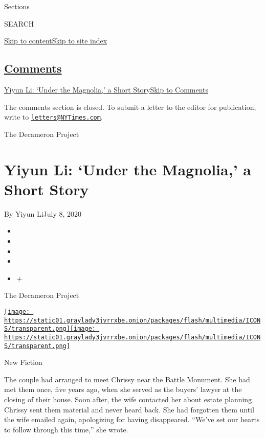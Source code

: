 Sections

SEARCH

\protect\hyperlink{site-content}{Skip to
content}\protect\hyperlink{site-index}{Skip to site index}

\hypertarget{comments}{%
\subsection{\texorpdfstring{\protect\hyperlink{commentsContainer}{Comments}}{Comments}}\label{comments}}

\href{}{Yiyun Li: `Under the Magnolia,' a Short Story}\href{}{Skip to
Comments}

The comments section is closed. To submit a letter to the editor for
publication, write to
\href{mailto:letters@NYTimes.com}{\nolinkurl{letters@NYTimes.com}}.

The Decameron Project

\hypertarget{yiyun-li-under-the-magnolia-a-short-story}{%
\section{Yiyun Li: `Under the Magnolia,' a Short
Story}\label{yiyun-li-under-the-magnolia-a-short-story}}

By Yiyun LiJuly 8, 2020

\begin{itemize}
\item
\item
\item
\item
\item
  \emph{+}
\end{itemize}

The Decameron Project

\href{https://www.nytimes3xbfgragh.onion/section/magazine}{\texttt{[image: https://static01.graylady3jvrrxbe.onion/packages/flash/multimedia/ICONS/transparent.png]}\texttt{[image: https://static01.graylady3jvrrxbe.onion/packages/flash/multimedia/ICONS/transparent.png]}}

New Fiction

The couple had arranged to meet Chrissy near the Battle Monument. She
had met them once, five years ago, when she served as the buyers' lawyer
at the closing of their house. Soon after, the wife contacted her about
estate planning. Chrissy sent them material and never heard back. She
had forgotten them until the wife emailed again, apologizing for having
disappeared. ``We've set our hearts to follow through this time,'' she
wrote.

